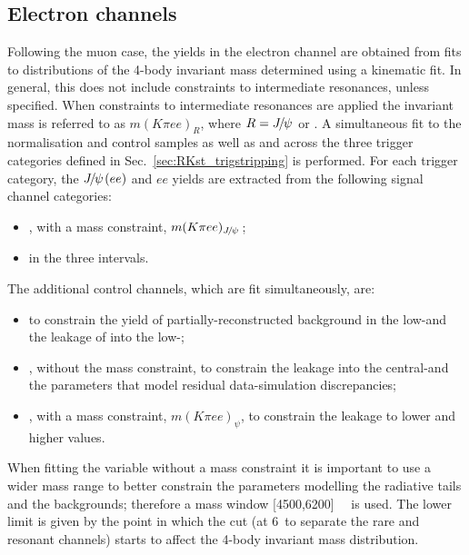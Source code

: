 \clearpage

\subsection{Electron channels}
\label{sec:RKst_fit_ee}

Following the muon case, the yields in the electron channel are obtained from fits to 
distributions of the 4-body invariant mass determined using a kinematic fit.
In general, this does not include constraints to intermediate resonances, unless specified.
When constraints to intermediate resonances are applied the invariant mass is referred to as
$m(K\pi ee)_R$, where $R = \jpsi$ or \psitwos.
A simultaneous fit to the normalisation and control samples as well as \BdToKstee and
across the three trigger categories defined in Sec.~\ref{sec:RKst_trigstripping} is performed.
%
For each trigger category, the $\jpsi(ee)$ and $ee$ yields are extracted from the following signal channel categories:
%
\begin{itemize}
\item \BdToKstJPsee, with a \jpsi mass constraint, $m(K\pi ee)_{\jpsi}$;
\item \BdToKstee in the three \qsq intervals.
\end{itemize}

The additional control channels, which are fit simultaneously, are:
%
\begin{itemize}
\item \BdToKstGee to constrain the yield of partially-reconstructed   background 
in the low-\qsq and the leakage of \BdToKstG into the low-\qsq;
\item \BdToKstJPsee, without the \jpsi mass constraint, to constrain the leakage into the central-\qsq and the 
parameters that model residual data-simulation discrepancies;
\item \BdToKstPsiee, with a \psitwos mass constraint,  $m(K\pi ee)_{\psi}$, to constrain the leakage to lower and higher \qsq values.
\end{itemize}

When fitting the variable without a \jpsi mass constraint it is important to use a wider mass range to better constrain the 
parameters modelling the radiative tails and the backgrounds; therefore a mass window [4500,6200]~\mevcc~ is used. The lower limit 
is given by the point in which the \qsq cut (at 6~\gevgevcccc to separate the rare and resonant channels)
starts to affect the 4-body invariant mass distribution. 
%
%

